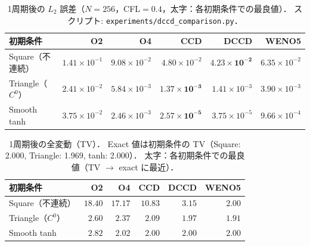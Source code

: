 \begin{table}[htbp]
\centering
\caption{1周期後の $L_2$ 誤差（$N=256$，CFL$=0.4$，太字：各初期条件での最良値）．
  スクリプト: \texttt{experiments/dccd\_comparison.py}．}
\label{tab:dccd_l2_bench}
\begin{tabular}{lrrrrr}
\toprule
初期条件 & O2 & O4 & CCD & DCCD & WENO5 \\
\midrule
Square（不連続） & $1.41\times10^{-1}$ & $9.08\times10^{-2}$ & $4.80\times10^{-2}$ & $\mathbf{4.23\times10^{-2}}$ & $6.35\times10^{-2}$ \\
Triangle（$C^0$） & $2.41\times10^{-2}$ & $5.84\times10^{-3}$ & $\mathbf{1.37\times10^{-3}}$ & $1.41\times10^{-3}$ & $3.90\times10^{-3}$ \\
Smooth tanh & $3.75\times10^{-2}$ & $2.46\times10^{-3}$ & $\mathbf{2.57\times10^{-5}}$ & $3.75\times10^{-5}$ & $9.66\times10^{-4}$ \\
\bottomrule
\end{tabular}
\end{table}

\begin{table}[htbp]
\centering
\caption{1周期後の全変動（TV）．
  Exact 値は初期条件の TV（Square: 2.000, Triangle: 1.969, tanh: 2.000）．
  太字：各初期条件での最良値（TV $\to$ exact に最近）．}
\label{tab:dccd_tv_bench}
\begin{tabular}{lrrrrr}
\toprule
初期条件 & O2 & O4 & CCD & DCCD & WENO5 \\
\midrule
Square（不連続） & $18.40$ & $17.17$ & $10.83$ & $3.15$ & $\mathbf{2.00}$ \\
Triangle（$C^0$） & $2.60$ & $2.37$ & $2.09$ & $1.97$ & $\mathbf{1.91}$ \\
Smooth tanh & $2.82$ & $2.02$ & $2.00$ & $2.00$ & $\mathbf{2.00}$ \\
\bottomrule
\end{tabular}
\end{table}


